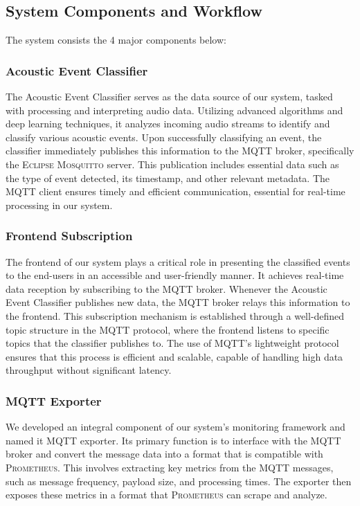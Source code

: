 \subsection{System Components and Workflow}
The system consists the 4 major components below:
\subsubsection{Acoustic Event Classifier}
The Acoustic Event Classifier serves as the data source of our system, tasked with processing and interpreting audio data\cite{sampath2019cnn}. Utilizing advanced algorithms and deep learning techniques, it analyzes incoming audio streams to identify and classify various acoustic events. Upon successfully classifying an event, the classifier immediately publishes this information to the MQTT broker, specifically the \textsc{Eclipse Mosquitto} server. This publication includes essential data such as the type of event detected, its timestamp, and other relevant metadata. The MQTT client ensures timely and efficient communication, essential for real-time processing in our system.

\subsubsection{Frontend Subscription}
The frontend of our system plays a critical role in presenting the classified events to the end-users in an accessible and user-friendly manner. It achieves real-time data reception by subscribing to the MQTT broker. Whenever the Acoustic Event Classifier publishes new data, the MQTT broker relays this information to the frontend. This subscription mechanism is established through a well-defined topic structure in the MQTT protocol, where the frontend listens to specific topics that the classifier publishes to. The use of MQTT’s lightweight protocol ensures that this process is efficient and scalable, capable of handling high data throughput without significant latency.

\subsubsection{MQTT Exporter}
We developed an integral component of our system's monitoring framework and named it MQTT exporter. Its primary function is to interface with the MQTT broker and convert the message data into a format that is compatible with \textsc{Prometheus}. This involves extracting key metrics from the MQTT messages, such as message frequency, payload size, and processing times. The exporter then exposes these metrics in a format that \textsc{Prometheus} can scrape and analyze.

